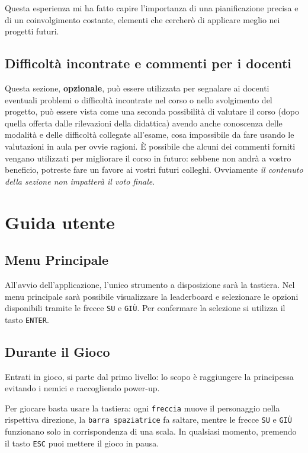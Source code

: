 \documentclass[a4paper,12pt]{report}
\begin{document}
Questa esperienza mi ha fatto capire l'importanza di una pianificazione precisa e di un coinvolgimento costante, elementi che cercherò di applicare meglio nei progetti futuri.

\section{Difficoltà incontrate e commenti per i docenti}

Questa sezione, \textbf{opzionale}, può essere utilizzata per segnalare ai docenti eventuali problemi o difficoltà incontrate nel corso o nello svolgimento del progetto, può essere vista come una seconda possibilità di valutare il corso (dopo quella offerta dalle rilevazioni della didattica) avendo anche conoscenza delle modalità e delle difficoltà collegate all'esame, cosa impossibile da fare usando le valutazioni in aula per ovvie ragioni.
%
È possibile che alcuni dei commenti forniti vengano utilizzati per migliorare il corso in futuro: sebbene non andrà a vostro beneficio, potreste fare un favore ai vostri futuri colleghi.
%
Ovviamente \textit{il contenuto della sezione non impatterà il voto finale}.

\appendix
\chapter{Guida utente}

\section{Menu Principale}
All'avvio dell'applicazione, l'unico strumento a disposizione sarà la tastiera. Nel menu principale sarà possibile visualizzare la leaderboard e selezionare le opzioni disponibili tramite le frecce \texttt{SU} e \texttt{GIÙ}. Per confermare la selezione si utilizza il tasto \texttt{ENTER}.

\section{Durante il Gioco}
Entrati in gioco, si parte dal primo livello: lo scopo è raggiungere la principessa evitando i nemici e raccogliendo power-up.

Per giocare basta usare la tastiera: ogni \texttt{freccia} muove il personaggio nella rispettiva direzione, la \texttt{barra spaziatrice} fa saltare, mentre le frecce \texttt{SU} e \texttt{GIÙ} funzionano solo in corrispondenza di una scala. In qualsiasi momento, premendo il tasto \texttt{ESC} puoi mettere il gioco in pausa.
\end{document}
